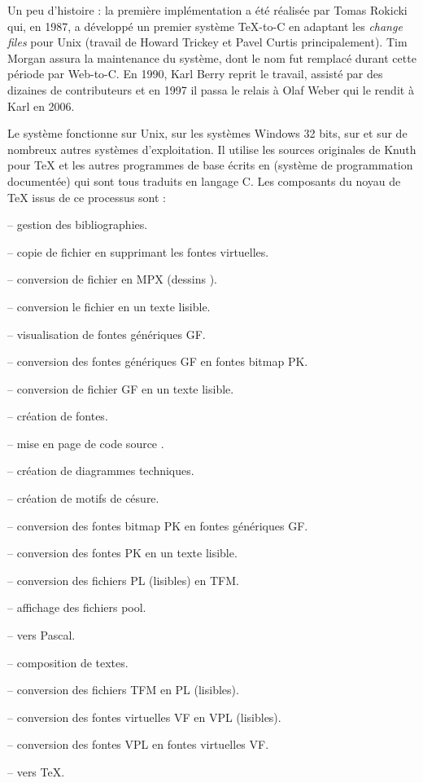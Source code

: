 \documentclass[german, english, french]{article}
\begin{document}
Un peu d'histoire : la première implémentation a été réalisée par Tomas Rokicki
qui, en 1987, a développé un premier système \TeX{}-to-C en adaptant les
\textit{change files} pour Unix (travail de Howard Trickey et Pavel Curtis
principalement).  Tim Morgan assura la maintenance du système, dont le nom fut
remplacé durant cette période par Web-to-C.  En 1990, Karl Berry reprit le
travail, assisté par des dizaines de contributeurs et en 1997 il passa le relais
à Olaf Weber qui le rendit à Karl en 2006.

Le système \Webc{} fonctionne sur Unix, sur les systèmes Windows 32 bits, sur
\MacOSX{} et sur de nombreux autres systèmes d'exploitation.  Il utilise les
sources originales de Knuth pour \TeX{} et les autres programmes de base écrits
en \web{} (système de programmation documentée) qui sont tous traduits en
langage C. Les composants du noyau de \TeX{} issus de ce processus sont :

\begin{cmddescription}
\item[bibtex] -- gestion des bibliographies.
\item[dvicopy] -- copie de fichier \dvi{} en supprimant les fontes virtuelles.
\item[dvitomp] -- conversion de fichier \dvi{} en MPX (dessins \MP{}).
\item[dvitype] -- conversion le fichier \dvi{} en un texte lisible.
\item[gftodvi] -- visualisation de fontes génériques GF.
\item[gftopk] -- conversion des fontes génériques GF en fontes bitmap PK.
\item[gftype] -- conversion de fichier GF en un texte lisible.
\item[mf] -- création de fontes.
\item[mft] -- mise en page de code source \MF{}.
\item[mpost] -- création de diagrammes techniques.
\item[patgen] -- création de motifs de césure.
\item[pktogf] -- conversion des fontes bitmap PK en fontes génériques GF.
\item[pktype] -- conversion des fontes PK en un texte lisible.
\item[pltotf] -- conversion des fichiers PL (lisibles) en TFM.
\item[pooltype] -- affichage des fichiers \web{} pool.
\item[tangle] -- \web{} vers Pascal.
\item[tex] -- composition de textes.
\item[tftopl] -- conversion des fichiers TFM en PL (lisibles).
\item[vftovp] -- conversion des fontes virtuelles VF en VPL (lisibles).
\item[vptovf] -- conversion des fontes VPL en fontes virtuelles VF.
\item[weave] -- \web{} vers \TeX.
\end{cmddescription}
\end{document}

